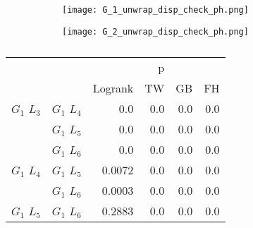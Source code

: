         

        \begin{figure}
        \centering
        \begin{subfigure}[b]{0.45\textwidth}
          \texttt{[image: G\_1\_unwrap\_disp\_check\_ph.png]}
          \caption{}
          \label{fig:g1_disp_check_ph}
        \end{subfigure}
        \hfill
        \begin{subfigure}[b]{0.45\textwidth}
          \texttt{[image: G\_2\_unwrap\_disp\_check\_ph.png]}
          \caption{}
          \label{fig:g1_disp_check_ph}
        \end{subfigure}
        \caption{}
        \label{fig:branch_disp_check_ph}
      \end{figure}

        
      

      \begin{table}
        \centering
        \begin{tabular}{llrrrr}
          \toprule
                       &             &         &  p &    &     \\
          \cmidrule{3-6}
                       &             & Logrank & TW & GB & FH  \\
          \midrule
          $G_1$ $L_3$  & $G_1$ $L_4$  &  0.0 &  0.0 &  0.0 &  0.0     \\
                       & $G_1$ $L_5$  & 0.0 & 0.0 & 0.0 & 0.0    \\
                       & $G_1$ $L_6$  & 0.0 & 0.0 & 0.0 & 0.0      \\
          $G_1$ $L_4$  & $G_1$ $L_5$  & 0.0072 & 0.0 & 0.0 & 0.0      \\
                       & $G_1$ $L_6$  & 0.0003 & 0.0 & 0.0 & 0.0       \\
          $G_1$ $L_5$   & $G_1$ $L_6$ & 0.2883 &  0.0 & 0.0 & 0.0      \\
          \bottomrule
        \end{tabular}
        \label{tab:g1_ingroup_tests_disp}
        \caption{}
      \end{table}


